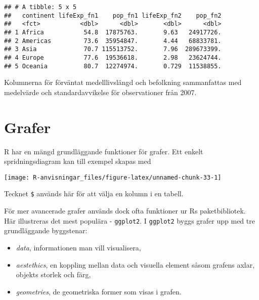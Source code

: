 \documentclass[
]{book}
\newenvironment{Shaded}{\begin{snugshade}}{\end{snugshade}}
\newcommand{\FunctionTok}[1]{\textcolor[rgb]{0.00,0.00,0.00}{#1}}
\newcommand{\NormalTok}[1]{#1}
\newcommand{\SpecialCharTok}[1]{\textcolor[rgb]{0.00,0.00,0.00}{#1}}
\providecommand{\tightlist}{%
  \setlength{\itemsep}{0pt}\setlength{\parskip}{0pt}}
\theoremstyle{definition}
\theoremstyle{definition}
\theoremstyle{definition}
\theoremstyle{definition}
\theoremstyle{remark}
\begin{document}
\begin{verbatim}
## # A tibble: 5 x 5
##   continent lifeExp_fn1    pop_fn1 lifeExp_fn2    pop_fn2
##   <fct>           <dbl>      <dbl>       <dbl>      <dbl>
## 1 Africa           54.8  17875763.       9.63   24917726.
## 2 Americas         73.6  35954847.       4.44   68833781.
## 3 Asia             70.7 115513752.       7.96  289673399.
## 4 Europe           77.6  19536618.       2.98   23624744.
## 5 Oceania          80.7  12274974.       0.729  11538855.
\end{verbatim}

Kolumnerna för förväntat medelllivslängd och befolkning sammanfattas med medelvärde och standardavvikelse för observationer från 2007.

\hypertarget{grafer}{%
\section{Grafer}\label{grafer}}

R har en mängd grundläggande funktioner för grafer. Ett enkelt spridningsdiagram kan till exempel skapas med

\begin{Shaded}
\end{Shaded}

\begin{center}\texttt{[image: R-anvisningar\_files/figure-latex/unnamed-chunk-33-1]} \end{center}

Tecknet \texttt{\$} används här för att välja en kolumn i en tabell.

För mer avancerade grafer används dock ofta funktioner ur Rs paketbibliotek. Här illustreras det mest populära - \texttt{ggplot2}. I \texttt{ggplot2} byggs grafer upp med tre grundläggande byggstenar:

\begin{itemize}
\tightlist
\item
  \emph{data}, informationen man vill visualisera,
\item
  \emph{aestethics}, en koppling mellan data och visuella element såsom grafens axlar, objekts storlek och färg,
\item
  \emph{geometries}, de geometriska former som visas i grafen.
\end{itemize}
\end{document}
